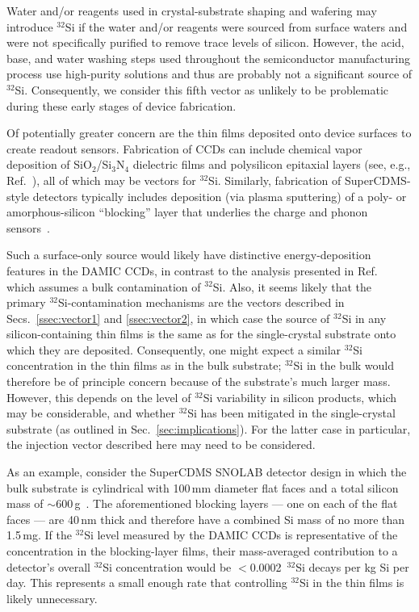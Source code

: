 \documentclass[final,5p]{elsarticle}
\def\si{$^{32}$Si\xspace}
\begin{document}
Water and/or reagents used in crystal-substrate shaping and wafering may introduce \si if the water and/or reagents were sourced from surface waters and were not specifically purified to remove trace levels of silicon.  However, the acid, base, and water washing steps used throughout the semiconductor manufacturing process use high-purity solutions and thus are probably not a significant source of \si. Consequently, we consider this fifth vector as unlikely to be problematic during these early stages of device fabrication.

Of potentially greater concern are the thin films deposited onto device surfaces to create readout sensors. Fabrication of CCDs can include chemical vapor deposition of SiO$_{2}$/Si$_{3}$N$_{4}$ dielectric films and polysilicon epitaxial layers (see, e.g., Ref.~\cite{ccd_fab}), all of which may be vectors for \si. Similarly, fabrication of SuperCDMS-style detectors typically includes deposition (via plasma sputtering) of a poly- or amorphous-silicon ``blocking'' layer  that underlies the charge and phonon sensors~\cite{scdms_fab}.

Such a surface-only source would likely have distinctive energy-deposition features in the DAMIC CCDs, in contrast to the analysis presented in Ref.\ \cite{damic_backgrounds} which assumes a bulk contamination of \si. Also, it seems likely that the primary \si-contamination mechanisms are the vectors described in Secs.~\ref{ssec:vector1} and \ref{ssec:vector2}, in which case the source of \si in any silicon-containing thin films is the same as for the single-crystal substrate onto which they are deposited. Consequently, one might expect a similar \si concentration in the thin films as in the bulk substrate; \si in the bulk would therefore be of principle concern because of the substrate's much larger mass. However, this depends on the level of \si variability in silicon products, which may be considerable, and whether \si has been mitigated in the single-crystal substrate (as outlined in Sec.~\ref{sec:implications}). For the latter case in particular, the injection vector described here may need to be considered. %

As an example, consider the SuperCDMS SNOLAB detector design in which the bulk substrate is cylindrical with 100\,mm diameter flat faces and a total silicon mass of $\sim$600\,g~\cite{sensitivity}.  The aforementioned blocking layers --- one on each of the flat faces --- are 40\,nm thick and therefore have a combined Si mass of no more than 1.5\,mg.  If the \si level measured by the DAMIC CCDs is representative of the concentration in the blocking-layer films, their mass-averaged contribution to a detector's overall \si concentration would be $<$0.0002~\si decays per kg Si per day.  This represents a small enough rate that controlling \si in the thin films is likely unnecessary.
\end{document}
